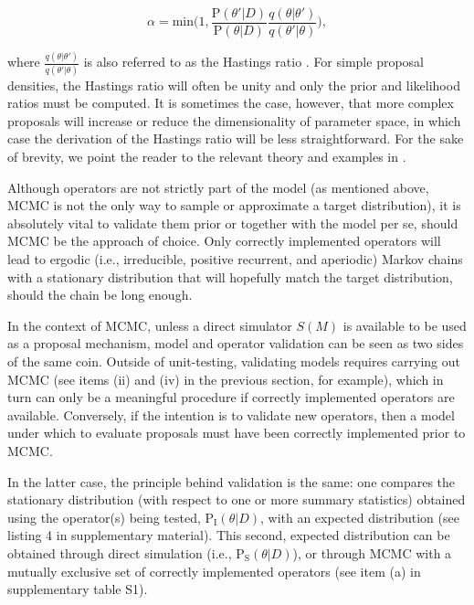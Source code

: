 \documentclass[oneside]{article}
\begin{document}
\begin{equation}
  \alpha = \text{min}\bigg(1, \frac{\text{P}(\theta'|D)}{\text{P}(\theta|D)} \frac{q(\theta|\theta')}{q(\theta'|\theta)} \bigg),
\end{equation}

\noindent where $\frac{q(\theta|\theta')}{q(\theta'|\theta)}$ is also
referred to as the Hastings ratio \citep{smith93,tierney94,gelman}.
For simple proposal densities, the Hastings ratio will often be unity and
only the prior and likelihood ratios must be computed.
It is sometimes the case, however, that more complex proposals will
increase or reduce the dimensionality of parameter space, in which
case the derivation of the Hastings ratio will be less straightforward.
For the sake of brevity, we point the reader to the relevant theory
and examples in \citep{green95,huelsenbeck04,drummond10}.

Although operators are not strictly part of the model (as mentioned
above, MCMC is not the only way to sample or approximate a target
distribution), it is absolutely vital to validate them prior or
together with the model per se, should MCMC be the approach of choice.
Only correctly implemented operators will lead to ergodic (i.e.,
irreducible, positive recurrent, and aperiodic) Markov
chains with a stationary distribution that will hopefully match
the target distribution, should the chain be long enough.

In the context of MCMC, unless a direct simulator $S(M)$ is
available to be used as a proposal mechanism, model and operator
validation can be seen as two sides of the same coin.
Outside of unit-testing, validating models requires carrying out MCMC
(see items (ii) and (iv) in the previous section, for example), which
in turn can only be a meaningful procedure if correctly implemented
operators are available.
Conversely, if the intention is to validate new operators, then a
model under which to evaluate proposals must have been correctly
implemented prior to MCMC.

In the latter case, the principle behind validation is the same: one
compares the stationary distribution (with respect to one or more summary
statistics) obtained using the operator(s)
being tested, $\text{P}_{\text{I}}(\theta|D)$, with an expected
distribution (see listing 4 in supplementary material).
This second, expected distribution can be obtained through direct
simulation (i.e., $\text{P}_{\text{S}}(\theta|D)$), or through MCMC
with a mutually exclusive set of correctly implemented operators (see
item (a) in supplementary table S1).
\end{document}
